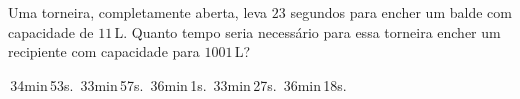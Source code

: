 Uma torneira, completamente aberta, leva $23$ segundos para encher um balde com capacidade de $11$\,L. Quanto tempo seria necessário para essa torneira encher um recipiente com capacidade para $1001$\,L?

\,34min\,53s.
\,33min\,57s.
\,36min\,1s.
\,33min\,27s.
\,36min\,18s.



